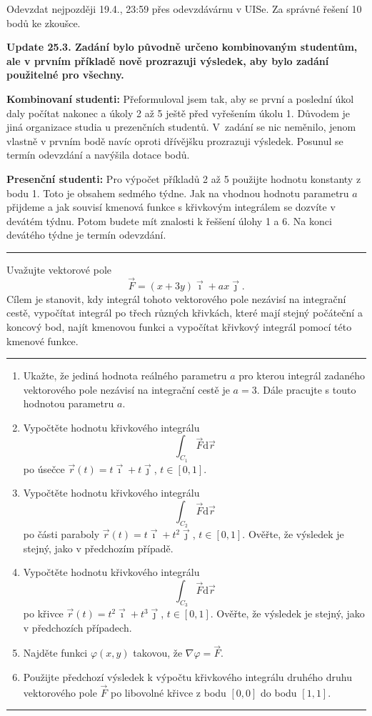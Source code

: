 \documentclass{article}
\begin{document}
{

  }


  Odevzdat nejpozději 19.4., 23:59 přes odevzdávárnu v UISe. Za správné řešení 10 bodů ke zkoušce.

  \textbf{Update 25.3. Zadání bylo původně určeno kombinovaným studentům, ale v prvním příkladě nově prozrazuji výsledek, aby bylo zadání použitelné  pro všechny.}

    \bigskip
  \textbf{Kombinovaní studenti:} Přeformuloval jsem tak, aby se první a poslední úkol daly počítat nakonec a úkoly 2 až 5 ještě před vyřešením úkolu 1. Důvodem je jiná organizace studia u prezenčních studentů. V~zadání se nic neměnilo, jenom vlastně v prvním bodě navíc oproti dřívějšku prozrazuji výsledek. Posunul se termín odevzdání a navýšila dotace bodů.

  \bigskip
  \textbf{Presenční studenti:} Pro výpočet příkladů 2 až 5 použijte hodnotu konstanty z bodu 1. Toto je obsahem sedmého týdne. Jak na vhodnou hodnotu parametru $a$ přijdeme a jak souvisí kmenová funkce s křivkovým integrálem se dozvíte v devátém týdnu. Potom budete mít znalosti k řeššení úlohy 1 a 6. Na konci devátého týdne je termín odevzdání.
  
  \bigskip
  \hrule
  
  \bigskip Uvažujte vektorové pole
  $$\vec F=(x+3y)\vec \imath + ax\vec\jmath.$$ Cílem je stanovit, kdy
  integrál tohoto vektorového pole nezávisí na integrační cestě,
  vypočítat integrál po třech různých křivkách, které mají stejný
  počáteční a koncový bod, najít kmenovou funkci a vypočítat křivkový
  integrál pomocí této kmenové funkce.  \bigskip \hrule
  
\begin{enumerate}[1)]
\item Ukažte, že jediná hodnota reálného parametru $a$ pro kterou integrál zadaného vektorového pole nezávisí na integrační cestě je $a=3$. Dále pracujte s touto hodnotou parametru $a$.
\item Vypočtěte hodnotu křivkového integrálu $$\int_{C_1} \vec F\mathrm d\vec r$$ po úsečce $\vec r(t)=t\vec \imath+t\vec \jmath$, $t\in[0,1]$.
\item Vypočtěte hodnotu křivkového integrálu $$\int_{C_2} \vec F\mathrm d\vec r$$ po části paraboly $\vec r(t)=t\vec \imath+t^2\vec \jmath$, $t\in[0,1]$. Ověřte, že výsledek je stejný, jako v předchozím případě.
\item Vypočtěte hodnotu křivkového integrálu $$\int_{C_3} \vec F\mathrm d\vec r$$ po křivce $\vec r(t)=t^2\vec \imath+t^3\vec \jmath$, $t\in[0,1]$. Ověřte, že výsledek je stejný, jako v předchozích případech.
\item Najděte funkci $\varphi(x,y)$ takovou, že $\nabla \varphi=\vec F.$
\item Použijte předchozí výsledek k výpočtu křivkového integrálu druhého druhu vektorového pole $\vec F$ po libovolné křivce z bodu $[0,0]$ do bodu $[1,1]$.
\end{enumerate}

\hrule
\bigskip
\end{document}
